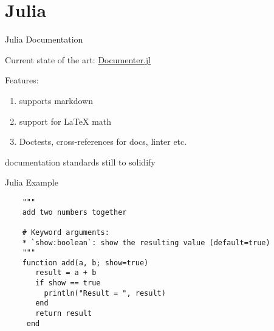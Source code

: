 \documentclass{beamer}
\begin{document}
\section{Julia}

\begin{frame}{Julia Documentation}

Current state of the art: \href{https://github.com/JuliaDocs/Documenter.jl}{Documenter.jl}

Features:
\begin{enumerate}
  \item supports markdown
  \item support for LaTeX math
  \item Doctests, cross-references for docs, linter etc.
\end{enumerate}

documentation standards still to solidify

\end{frame}

\begin{frame}[fragile]{Julia Example}

  \begin{verbatim}
    """
    add two numbers together

    # Keyword arguments:
    * `show:boolean`: show the resulting value (default=true)   
    """
    function add(a, b; show=true)
       result = a + b
       if show == true
         println("Result = ", result)
       end
       return result
     end

  \end{verbatim}

\end{frame}
\end{document}
